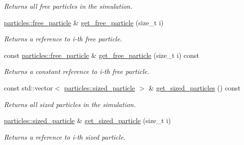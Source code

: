 \begin{DoxyCompactItemize}
\begin{DoxyCompactList}\small\item\em Returns all free particles in the simulation. \end{DoxyCompactList}\item 
\mbox{\label{classphysim_1_1simulator_a4e357245a3b138c46c8b52647b65cfa0}} 
\hyperlink{classphysim_1_1particles_1_1free__particle}{particles\+::free\+\_\+particle} \& \hyperlink{classphysim_1_1simulator_a4e357245a3b138c46c8b52647b65cfa0}{get\+\_\+free\+\_\+particle} (size\+\_\+t i)
\begin{DoxyCompactList}\small\item\em Returns a reference to i-\/th free particle. \end{DoxyCompactList}\item 
\mbox{\label{classphysim_1_1simulator_ae2db5d5199ffa176bc5e08fee2d41a31}} 
const \hyperlink{classphysim_1_1particles_1_1free__particle}{particles\+::free\+\_\+particle} \& \hyperlink{classphysim_1_1simulator_ae2db5d5199ffa176bc5e08fee2d41a31}{get\+\_\+free\+\_\+particle} (size\+\_\+t i) const
\begin{DoxyCompactList}\small\item\em Returns a constant reference to i-\/th free particle. \end{DoxyCompactList}\item 
const std\+::vector$<$ \hyperlink{classphysim_1_1particles_1_1sized__particle}{particles\+::sized\+\_\+particle} $>$ \& \hyperlink{classphysim_1_1simulator_acf45d34a15b06437858e3324af1a559c}{get\+\_\+sized\+\_\+particles} () const
\begin{DoxyCompactList}\small\item\em Returns all sized particles in the simulation. \end{DoxyCompactList}\item 
\mbox{\label{classphysim_1_1simulator_a5fd37f79deceb3be5b4d70c9b421a637}} 
\hyperlink{classphysim_1_1particles_1_1sized__particle}{particles\+::sized\+\_\+particle} \& \hyperlink{classphysim_1_1simulator_a5fd37f79deceb3be5b4d70c9b421a637}{get\+\_\+sized\+\_\+particle} (size\+\_\+t i)
\begin{DoxyCompactList}\small\item\em Returns a reference to i-\/th sized particle. \end{DoxyCompactList}\item 

\end{DoxyCompactItemize}
